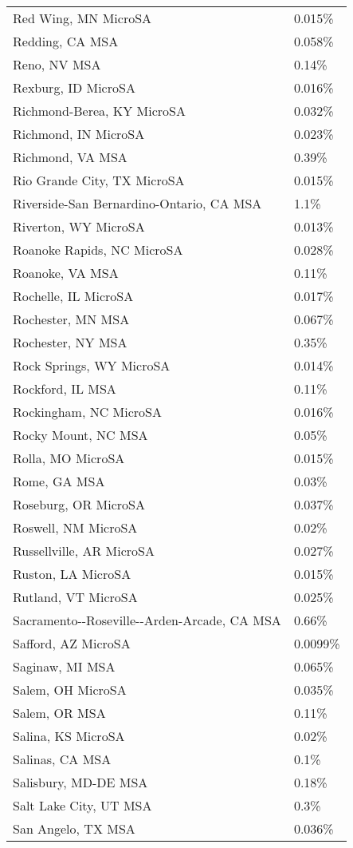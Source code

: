 \begin{longtable}[]{@{}ll@{}}
Red Wing, MN MicroSA & 0.015\% \\
Redding, CA MSA & 0.058\% \\
Reno, NV MSA & 0.14\% \\
Rexburg, ID MicroSA & 0.016\% \\
Richmond-Berea, KY MicroSA & 0.032\% \\
Richmond, IN MicroSA & 0.023\% \\
Richmond, VA MSA & 0.39\% \\
Rio Grande City, TX MicroSA & 0.015\% \\
Riverside-San Bernardino-Ontario, CA MSA & 1.1\% \\
Riverton, WY MicroSA & 0.013\% \\
Roanoke Rapids, NC MicroSA & 0.028\% \\
Roanoke, VA MSA & 0.11\% \\
Rochelle, IL MicroSA & 0.017\% \\
Rochester, MN MSA & 0.067\% \\
Rochester, NY MSA & 0.35\% \\
Rock Springs, WY MicroSA & 0.014\% \\
Rockford, IL MSA & 0.11\% \\
Rockingham, NC MicroSA & 0.016\% \\
Rocky Mount, NC MSA & 0.05\% \\
Rolla, MO MicroSA & 0.015\% \\
Rome, GA MSA & 0.03\% \\
Roseburg, OR MicroSA & 0.037\% \\
Roswell, NM MicroSA & 0.02\% \\
Russellville, AR MicroSA & 0.027\% \\
Ruston, LA MicroSA & 0.015\% \\
Rutland, VT MicroSA & 0.025\% \\
Sacramento-\/-Roseville-\/-Arden-Arcade, CA MSA & 0.66\% \\
Safford, AZ MicroSA & 0.0099\% \\
Saginaw, MI MSA & 0.065\% \\
Salem, OH MicroSA & 0.035\% \\
Salem, OR MSA & 0.11\% \\
Salina, KS MicroSA & 0.02\% \\
Salinas, CA MSA & 0.1\% \\
Salisbury, MD-DE MSA & 0.18\% \\
Salt Lake City, UT MSA & 0.3\% \\
San Angelo, TX MSA & 0.036\% \\

\end{longtable}
